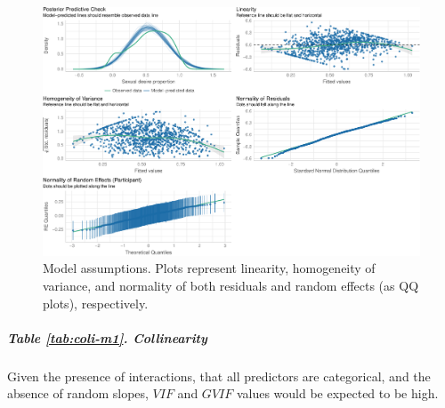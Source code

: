 \documentclass[
  bookmarksnumbered]{article}
\begin{document}
\begin{figure}
\centering
\includegraphics{Sexual_Desire_Arousal_files/figure-latex/assu-m1-1.pdf}
\caption{\label{fig:assu-m1}Model assumptions. Plots represent linearity, homogeneity of variance, and normality of both residuals and random effects (as QQ plots), respectively.}
\end{figure}

\hypertarget{table-reftabcoli-m1.-collinearity}{%
\subparagraph{Table \ref{tab:coli-m1}. Collinearity}\label{table-reftabcoli-m1.-collinearity}}

Given the presence of interactions, that all predictors are categorical, and the absence of random slopes, \(VIF\) and \(GVIF\) values would be expected to be high.
\end{document}
